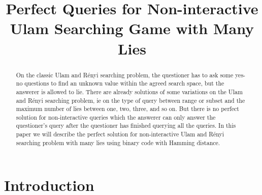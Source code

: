 \documentclass[conference,compsoc]{IEEEtran}
\begin{document}
\title{Perfect Queries for Non-interactive\\Ulam Searching Game with Many Lies}

\author{
}

\maketitle

\begin{abstract}
On the classic Ulam and Rényi searching problem, the questioner has to ask some yes-no questions to find an unknown value within the agreed search space, but the answerer is allowed to lie. There are already solutions of some variations on the Ulam and Rényi searching problem, ie on the type of query between range or subset and the maximum number of lies between one, two, three, and so on. But there is no perfect solution for non-interactive queries which the answerer can only answer the questioner's query after the questioner has finished querying all the queries. In this paper we will describe the perfect solution for non-interactive Ulam and Rényi searching problem with many lies using binary code with Hamming distance.
\end{abstract}

\IEEEpeerreviewmaketitle

\section{Introduction}
\end{document}
